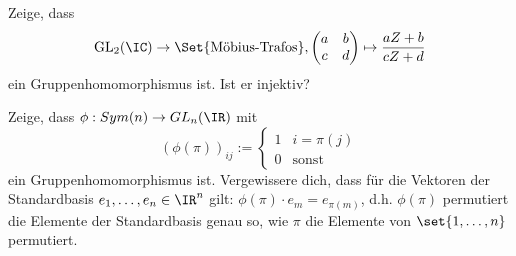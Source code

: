 \begin{sheet}
\begin{problem}
Zeige, dass
\[\operatorname{GL}_2(\IC)\to \Set{\text{Möbius-Trafos}}, \begin{pmatrix} a & b \\ c & d \end{pmatrix} \mapsto \frac{aZ+b}{cZ+d}\]
ein Gruppenhomomorphismus ist. Ist er injektiv?
\end{problem}

\begin{problem}[title={Permutationsmatrizen}]
Zeige, dass $\phi: Sym(n) \to GL_n(\IR)$ mit
\[(\phi(\pi))_{ij} := \begin{cases} 1 & i=\pi(j) \\ 0 & \text{sonst} \end{cases}\]
ein Gruppenhomomorphismus ist. Vergewissere dich, dass für die Vektoren der Standardbasis $e_1,\ldots,e_n\in\IR^n$ gilt: $\phi(\pi)\cdot e_m = e_{\pi(m)}$, d.h. $\phi(\pi)$ permutiert die Elemente der Standardbasis genau so, wie $\pi$ die Elemente von $\set{1,\ldots,n}$ permutiert.
\end{problem}


\end{sheet}